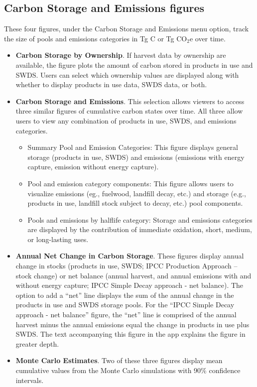 \documentclass[
  openany]{book}
\providecommand{\tightlist}{%
  \setlength{\itemsep}{0pt}\setlength{\parskip}{0pt}}
\begin{document}
\hypertarget{app-shiny-cse}{%
\subsection{Carbon Storage and Emissions figures}\label{app-shiny-cse}}

These four figures, under the Carbon Storage and Emissions menu option,
track the size of pools and emissions categories in Tg C or Tg CO\(_2\)e
over time.

\begin{itemize}
\item
  \textbf{Carbon Storage by Ownership}. If harvest data by ownership are
  available, the figure plots the amount of carbon stored in products in
  use and SWDS. Users can select which ownership values are displayed
  along with whether to display products in use data, SWDS data, or
  both.\\
\item
  \textbf{Carbon Storage and Emissions}. This selection allows viewers
  to access three similar figures of cumulative carbon states over time.
  All three allow users to view any combination of products in use,
  SWDS, and emissions categories.

  \begin{itemize}
  \tightlist
  \item
    Summary Pool and Emission Categories: This figure displays general
    storage (products in use, SWDS) and emissions (emissions with energy
    capture, emission without energy capture).
  \item
    Pool and emission category components: This figure allows users to
    visualize emissions (eg., fuelwood, landfill decay, etc.) and
    storage (e.g., products in use, landfill stock subject to decay,
    etc.) pool components.
  \item
    Pools and emissions by halflife category: Storage and emissions
    categories are displayed by the contribution of immediate oxidation,
    short, medium, or long-lasting uses.\\
  \end{itemize}
\item
  \textbf{Annual Net Change in Carbon Storage}. These figures display
  annual change in stocks (products in use, SWDS; IPCC Production
  Approach -- stock change) or net balance (annual harvest, and annual
  emissions with and without energy capture; IPCC Simple Decay approach
  - net balance). The option to add a ``net'' line displays the sum of
  the annual change in the products in use and SWDS storage pools. For
  the ``IPCC Simple Decay approach - net balance'' figure, the ``net''
  line is comprised of the annual harvest minus the annual emissions
  equal the change in products in use plus SWDS. The text accompanying
  this figure in the app explains the figure in greater depth.
\item
  \textbf{Monte Carlo Estimates}. Two of these three figures display
  mean cumulative values from the Monte Carlo simulations with 90\%
  confidence intervals.


\end{itemize}
\end{document}
